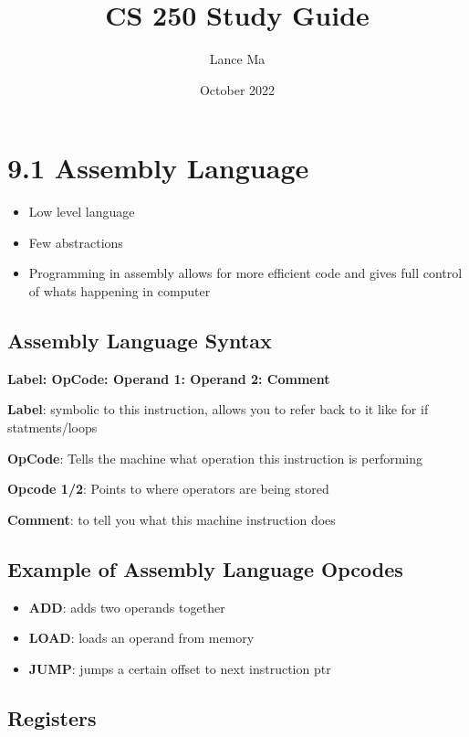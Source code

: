 \documentclass{article}
\title{CS 250 Study Guide}
\author{Lance Ma}
\date{October 2022}
\begin{document}
\maketitle

\section{9.1 Assembly Language}

\begin{itemize}
    \item Low level language
    
    \item Few abstractions
    
    \item Programming in assembly allows for more efficient code and gives full control of whats happening in computer
    

\end{itemize}


\subsection{Assembly Language Syntax}

\textbf{Label: OpCode: Operand 1: Operand 2: Comment}

\textbf{Label}: symbolic to this instruction, allows you to refer back to it like for if statments/loops

\textbf{OpCode}: Tells the machine what operation this instruction is performing

\textbf{Opcode 1/2}: Points to where operators are being stored 

\textbf{Comment}: to tell you what this machine instruction does

\subsection{Example of Assembly Language Opcodes} 
\begin{itemize}
    \item \textbf{ADD}: adds two operands together
    \item \textbf{LOAD}: loads an operand from memory
    \item \textbf{JUMP}: jumps a certain offset to next instruction ptr
    \end{itemize}

\subsection{Registers}
\end{document}
